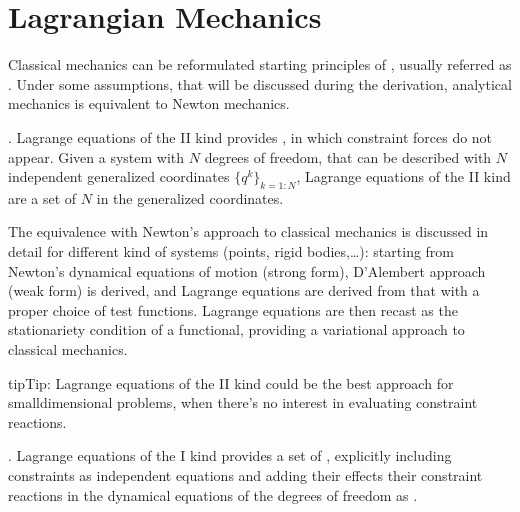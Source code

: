 \documentclass[letterpaper,10pt,english]{jupyterBook}
\begin{document}
\sphinxstepscope




\chapter{Lagrangian Mechanics}
\label{\detokenize{ch/lagrange:lagrangian-mechanics}}\label{\detokenize{ch/lagrange:classical-mechanics-lagrange}}\label{\detokenize{ch/lagrange::doc}}
\sphinxAtStartPar
Classical mechanics can be re\sphinxhyphen{}formulated starting principles of , usually referred as . Under some assumptions, that will be discussed during the derivation, analytical mechanics is equivalent to Newton mechanics.

\sphinxAtStartPar
{\hyperref[\detokenize{ch/lagrange-ii-type:classical-mechanics-lagrange-ii-type}]{}}. Lagrange equations of the II kind provides , in which constraint forces do not appear. Given a system with \(N\) degrees of freedom, that can be described with \(N\) independent generalized coordinates \(\{ q^k \}_{k=1:N}\), Lagrange equations of the II kind are a set of \(N\)  in the generalized coordinates.

\sphinxAtStartPar
The equivalence with Newton’s approach to classical mechanics is discussed in detail for different kind of systems (points, rigid bodies,…): starting from Newton’s dynamical equations of motion (strong form), D’Alembert approach (weak form) is derived, and Lagrange equations are derived from that with a proper choice of test functions. Lagrange equations are then recast as the stationariety condition of a functional, providing a variational approach to classical mechanics.

\begin{sphinxadmonition}{tip}{Tip:}
\sphinxAtStartPar
Lagrange equations of the II kind could be the best approach for small\sphinxhyphen{}dimensional problems, when there’s no interest in evaluating constraint reactions.
\end{sphinxadmonition}

\sphinxAtStartPar
{\hyperref[\detokenize{ch/lagrange-i-type:classical-mechanics-lagrange-i-type}]{}}. Lagrange equations of the I kind provides a set of , explicitly including constraints as independent equations and adding their effects \sphinxhyphen{} their constraint reactions \sphinxhyphen{} in the dynamical equations of the degrees of freedom as .
\end{document}
